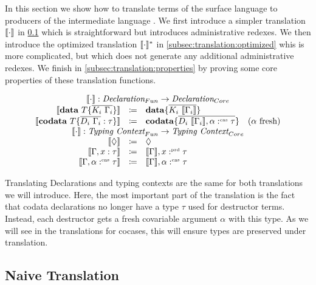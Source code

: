 In this section we show how to translate terms of the surface language \surfacelang{} to producers of the intermediate language \targetlang.
We first introduce a simpler translation $\llbracket \cdot \rrbracket$ in \cref{subsec:translation:naive} which is straightforward but introduces administrative redexes.
We then introduce the optimized translation $\llbracket \cdot \rrbracket_{}^{\ast}$ in \cref{subsec:translation:optimized} whis is more complicated, but which does not generate 
any additional administrative redexes.
We finish in \cref{subsec:translation:properties} by proving some core properties of these translation functions.

\[
  \begin{array}{rcll}
    \multicolumn{4}{c}{\translate{\cdot{}}{} : \emph{Declaration}_{Fun} \rightarrow \emph{Declaration}_{Core}}\\
    \translate{\mathbf{data}\ T \{ \overline{K_i\ \Gamma_i} \}}{} & \coloneq & \mathbf{data} \{ \overline{K_i\ \translate{\Gamma_i}}\}\\
    \translate{\mathbf{codata}\ T \{ \overline{D_i\ \Gamma_i} : \tau \}}{} & \coloneq & \mathbf{codata} \{ \overline{D_i\ \translate{\Gamma_i},\alpha\cnt\tau}\} & \fresh{\alpha}\\
    \multicolumn{4}{c}{\translate{\cdot{}}{} : \emph{Typing Context}_{Fun} \rightarrow \emph{Typing Context}_{Core}}\\
    \translate{\nil}{} & \coloneq & \nil \\
    \translate{\Gamma,x:\tau}{} & \coloneq & \translate{\Gamma}, x\prd\tau\\
    \translate{\Gamma,\alpha\cnt\tau}{} & \coloneq & \translate{\Gamma}, \alpha\cnt\tau
  \end{array}
\]

Translating Declarations and typing contexts are the same for both translations we will introduce. 
Here, the most important part of the translation is the fact that codata declarations no longer have a type $\tau$ used for destructor terms.
Instead, each destructor gets a fresh covariable argument $\alpha$ with this type.
As we will see in the translations for cocases, this will ensure types are preserved under translation.

\subsection{Naive Translation}
\label{subsec:translation:naive}

